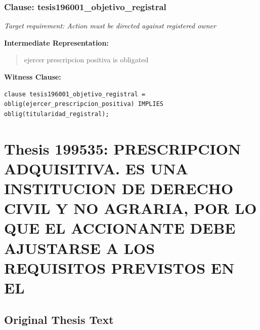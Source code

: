 \documentclass[11pt,a4paper]{article}
\begin{document}
\subsubsection{Clause: tesis196001\_objetivo\_registral}

\textit{Target requirement: Action must be directed against registered owner}

\textbf{Intermediate Representation:}

\begin{quote}
ejercer prescripcion positiva is obligated
\end{quote}

\textbf{Witness Clause:}

\begin{lstlisting}[style=witnessstyle, language=Witness]
clause tesis196001_objetivo_registral = oblig(ejercer_prescripcion_positiva) IMPLIES oblig(titularidad_registral);
\end{lstlisting}

\newpage

\section{Thesis 199535: PRESCRIPCION ADQUISITIVA. ES UNA INSTITUCION DE DERECHO CIVIL Y NO AGRARIA, POR LO QUE EL ACCIONANTE DEBE AJUSTARSE A LOS REQUISITOS PREVISTOS EN EL}
\label{thesis:199535}

\subsection{Original Thesis Text}
\end{document}
